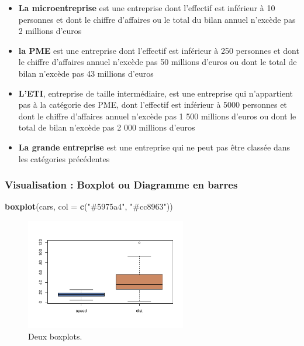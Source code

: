 \documentclass[mstat,12pt]{unswthesis}
\newenvironment{Shaded}{\begin{snugshade}}{\end{snugshade}}
\newcommand{\AttributeTok}[1]{\textcolor[rgb]{0.13,0.29,0.53}{#1}}
\newcommand{\FunctionTok}[1]{\textcolor[rgb]{0.13,0.29,0.53}{\textbf{#1}}}
\newcommand{\NormalTok}[1]{#1}
\newcommand{\StringTok}[1]{\textcolor[rgb]{0.31,0.60,0.02}{#1}}
\begin{document}
\begin{itemize}[label=$\circ$]
  \item \textnormal{ \textbf{La microentreprise} est une entreprise dont l'effectif est inférieur à 10 personnes et dont le chiffre d'affaires ou le total du bilan annuel n'excède pas 2 millions d'euros}
\item \textnormal{ \textbf{la PME} est une entreprise dont l’effectif est inférieur à 250 personnes
et dont le chiffre d’affaires annuel n'excède pas 50 millions d'euros ou
dont le total de bilan n'excède pas 43 millions d'euros }
\item \textnormal{\textbf{L'ETI}, entreprise de taille intermédiaire, est une entreprise qui n'appartient pas à la catégorie des PME, dont l’effectif est inférieur à 5000 personnes et dont le chiffre d'affaires annuel n'excède pas 1 500 millions d'euros ou dont le total de bilan n'excède pas 2 000 millions d'euros}
\item \textnormal{\textbf{La grande entreprise} est une entreprise qui ne peut pas être classée
dans les catégories précédentes}
\end{itemize}
\newpage

\subsubsection{Visualisation : Boxplot ou Diagramme en
barres}\label{visualisation-boxplot-ou-diagramme-en-barres}

\begin{Shaded}
\begin{Highlighting}[]
\FunctionTok{boxplot}\NormalTok{(cars, }\AttributeTok{col =} \FunctionTok{c}\NormalTok{(}\StringTok{"\#5975a4"}\NormalTok{, }\StringTok{"\#cc8963"}\NormalTok{))}
\end{Highlighting}
\end{Shaded}

\begin{figure}

{\centering \includegraphics[width=7cm]{scdon2-UPV-report-template_sansPython_files/figure-latex/unnamed-chunk-5-1} 

}

\caption{\label{fig:boxplots}Deux boxplots.}\label{fig:unnamed-chunk-5}
\end{figure}
\end{document}
